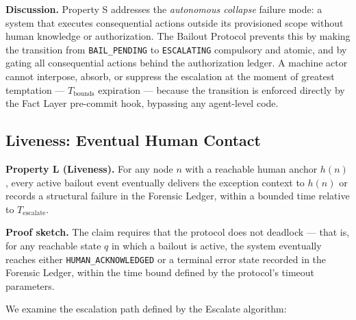 \medskip
\noindent\textbf{Discussion.} Property S addresses the \emph{autonomous collapse} failure mode: a system that executes consequential actions outside its provisioned scope without human knowledge or authorization. The Bailout Protocol prevents this by making the transition from \texttt{BAIL\_PENDING} to \texttt{ESCALATING} compulsory and atomic, and by gating all consequential actions behind the authorization ledger. A machine actor cannot interpose, absorb, or suppress the escalation at the moment of greatest temptation — $T_{\text{bounds}}$ expiration — because the transition is enforced directly by the Fact Layer pre-commit hook, bypassing any agent-level code.

\subsection{Liveness: Eventual Human Contact}

\textbf{Property L (Liveness).} For any node $n$ with a reachable human anchor $h(n)$, every active bailout event eventually delivers the exception context to $h(n)$ or records a structural failure in the Forensic Ledger, within a bounded time relative to $T_{\text{escalate}}$.

\medskip
\noindent\textbf{Proof sketch.} The claim requires that the protocol does not deadlock — that is, for any reachable state $q$ in which a bailout is active, the system eventually reaches either \texttt{HUMAN\_ACKNOWLEDGED} or a terminal error state recorded in the Forensic Ledger, within the time bound defined by the protocol's timeout parameters.

We examine the escalation path defined by the Escalate algorithm:

